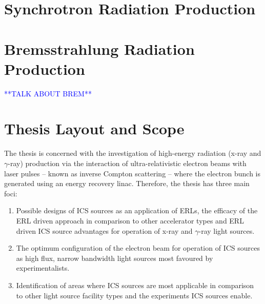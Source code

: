 \documentclass[../main.tex]{subfiles}
\begin{document}
\section{Synchrotron Radiation Production}
\section{Bremsstrahlung Radiation Production}
\textcolor{blue}{**TALK ABOUT BREM**}
\label{sec:bremsstrahlung}

\section{Thesis Layout and Scope}

The thesis is concerned with the investigation of high-energy radiation (x-ray and $\gamma$-ray) production via the interaction of ultra-relativistic electron beams with laser pulses -- known as inverse Compton scattering -- where the electron bunch is generated using an energy recovery linac. Therefore, the thesis has three main foci: 
\begin{enumerate}
    \item{Possible designs of ICS sources as an application of ERLs, the efficacy of the ERL driven approach in comparison to other accelerator types and ERL driven ICS source advantages for operation of x-ray and $\gamma$-ray light sources.}
    \item{The optimum configuration of the electron beam for operation of ICS sources as high flux, narrow bandwidth light sources most favoured by experimentalists.}
    \item{Identification of areas where ICS sources are most applicable in comparison to other light source facility types and the experiments ICS sources enable.}
\end{enumerate}
\end{document}
